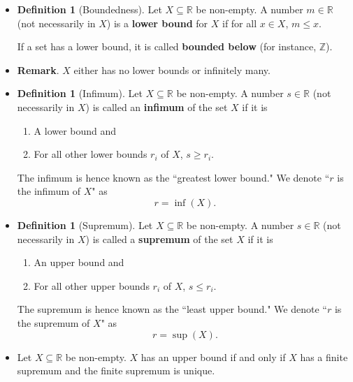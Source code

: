 \documentclass{article}
\newcommand{\Z}{\mathbb{Z}}
\newcommand{\R}{\mathbb{R}}
\newcommand{\?}{\stackrel{?}{=}}
\theoremstyle{definition} %
\newtheorem{definition}[theorem]{Definition} %
\begin{document}
\begin{itemize}
    \item[]
          \begin{definition}[Boundedness]
              Let $X \subseteq \R$ be non-empty. A number $m \in \R$ (not necessarily in $X$) is a \textbf{lower bound} for $X$ if for all $x \in X$, $m \leq x$.
          \end{definition}
          If a set has a lower bound, it is called \textbf{bounded below} (for instance, $\Z$).
    \item \textbf{Remark}. $X$ either has no lower bounds or infinitely many.
    \item[]
          \begin{definition}[Infimum]
              Let $X \subseteq \R$ be non-empty. A number $s \in \R$ (not necessarily in $X$) is called an \textbf{infimum} of the set $X$ if it is
              \begin{enumerate}[label=(\arabic*)]
                  \item A lower bound and
                  \item For all other lower bounds $r_i$ of $X$, $s \geq r_i$.
              \end{enumerate}
              The infimum is hence known as the ``greatest lower bound." We denote ``$r$ is the infimum of $X$" as
              $$r = \inf(X).$$
          \end{definition}
    \item[]
          \begin{definition}[Supremum]
              Let $X \subseteq \R$ be non-empty. A number $s \in \R$ (not necessarily in $X$) is called a \textbf{supremum} of the set $X$ if it is
              \begin{enumerate}[label=(\arabic*)]
                  \item An upper bound and
                  \item For all other upper bounds $r_i$ of $X$, $s \leq r_i$.
              \end{enumerate}
              The supremum is hence known as the ``least upper bound." We denote ``$r$ is the supremum of $X$" as
              $$r = \sup(X).$$
          \end{definition}
    \item[]
          \begin{theorem}
              Let $X \subseteq \R$ be non-empty. $X$ has an upper bound if and only if $X$ has a finite supremum and the finite supremum is unique.

\end{theorem}
\end{itemize}
\end{document}
